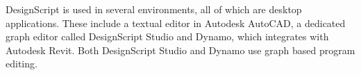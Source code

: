 
DesignScript is used in several environments, all of which are desktop applications.
These include a textual editor in Autodesk AutoCAD, a dedicated graph editor called DesignScript Studio and Dynamo, which integrates with Autodesk Revit.
Both DesignScript Studio and Dynamo use graph based program editing.




